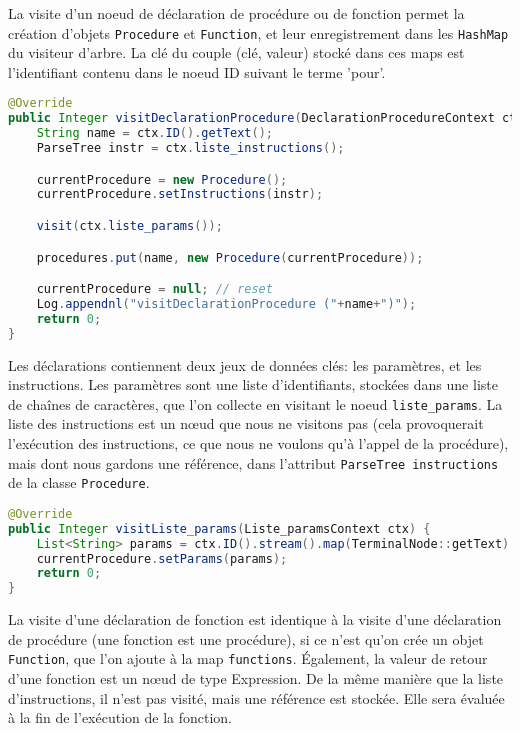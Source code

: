 \documentclass[a4paper,11pt]{article}
\begin{document}
La visite d'un noeud de déclaration de procédure ou de fonction permet la création d'objets \lstinline$Procedure$ et \lstinline$Function$, et leur enregistrement dans les \lstinline$HashMap$ du visiteur d'arbre. La clé du couple (clé, valeur) stocké dans ces maps est l'identifiant contenu dans le noeud ID suivant le terme 'pour'.

\begin{lstlisting}[language=Java]
@Override
public Integer visitDeclarationProcedure(DeclarationProcedureContext ctx) {
    String name = ctx.ID().getText();
    ParseTree instr = ctx.liste_instructions();

    currentProcedure = new Procedure();
    currentProcedure.setInstructions(instr);

    visit(ctx.liste_params());

    procedures.put(name, new Procedure(currentProcedure));

    currentProcedure = null; // reset
    Log.appendnl("visitDeclarationProcedure ("+name+")");
    return 0;
}
\end{lstlisting}

Les déclarations contiennent deux jeux de données clés: les paramètres, et les instructions. Les paramètres sont une liste d'identifiants, stockées dans une liste de chaînes de caractères, que l'on collecte en visitant le noeud \lstinline$liste_params$. La liste des instructions est un nœud que nous ne visitons pas (cela provoquerait l'exécution des instructions, ce que nous ne voulons qu'à l'appel de la procédure), mais dont nous gardons une référence, dans l'attribut \lstinline$ParseTree instructions$ de la classe \lstinline$Procedure$.

\begin{lstlisting}[language=Java]
@Override
public Integer visitListe_params(Liste_paramsContext ctx) {
    List<String> params = ctx.ID().stream().map(TerminalNode::getText).collect(Collectors.toList());
    currentProcedure.setParams(params);
    return 0;
}
\end{lstlisting}

La visite d'une déclaration de fonction est identique à la visite d'une déclaration de procédure (une fonction est une procédure), si ce n'est qu'on crée un objet \lstinline$Function$, que l'on ajoute à la map \lstinline$functions$. Également, la valeur de retour d'une fonction est un nœud de type Expression. De la même manière que la liste d'instructions, il n'est pas visité, mais une référence est stockée. Elle sera évaluée à la fin de l'exécution de la fonction.
\end{document}
